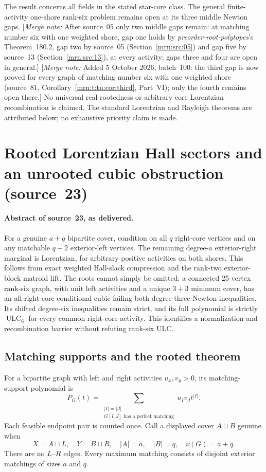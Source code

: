 \documentclass[11pt,a4paper]{article}
\theoremstyle{remark}\newtheorem{remark}[theorem]{Remark}
\newcommand{\ULC}{\operatorname{ULC}}      %
\newcommand{\mnote}[1]{[\textit{Merge note:} #1]}
\newcommand{\prp}{\emph{preorder-root-polytopes}}
\begin{document}
The result concerns all fields in the stated star-core class. The general
finite-activity one-shore rank-six problem remains open at its three middle
Newton gaps. \mnote{After source~05 only two middle gaps remain: at matching number six with one weighted shore, gap one holds by \prp's Theorem~180.2, gap two by source~05 (Section~\ref{mrn:src:05}) and gap five by source~13 (Section~\ref{mrn:src:13}), at every activity; gaps three and four are open in general.} \mnote{Added 5 October 2026, batch~100: the third gap is now proved for every graph of matching number six with one weighted shore (source~81, Corollary~\ref{mrn:t:tn:cor:third}, Part~VI); only the fourth remains open there.} No universal real-rootedness or arbitrary-core Lorentzian
recombination is claimed. The standard Lorentzian and Rayleigh theorems are
attributed below; no exhaustive priority claim is made.

\section{Rooted Lorentzian Hall sectors and an unrooted cubic obstruction (source~23)}\label{mrn:src:23}
\paragraph{Abstract of source~23, as delivered.} For a genuine $a+q$ bipartite cover, condition on all $q$ right-core vertices and on any matchable $q-2$ exterior-left vertices. The remaining degree-$a$ exterior-right marginal is Lorentzian, for arbitrary positive activities on both shores. This follows from exact weighted Hall-slack compression and the rank-two exterior-block matroid lift. The roots cannot simply be omitted: a connected 25-vertex rank-six graph, with unit left activities and a unique $3+3$ minimum cover, has an all-right-core conditional cubic failing both degree-three Newton inequalities. Its shifted degree-six inequalities remain strict, and its full polynomial is strictly $\ULC_6$ for every common right-core activity. This identifies a normalization and recombination barrier without refuting rank-six ULC.

\subsection{Matching supports and the rooted theorem}
For a bipartite graph with left and right activities $u_x,v_y>0$, its matching-support polynomial is
\[
 P_G(t)=\sum_{\substack{|I|=|J|\\G[I,J]\text{ has a perfect matching}}}
                 u_Iv_Jt^{|I|}.
\]
Each feasible endpoint pair is counted once. Call a displayed cover $A\sqcup B$ genuine when
\[
 X=A\sqcup L,\quad Y=B\sqcup R,\quad
 |A|=a,\quad |B|=q,\quad \nu(G)=a+q.
\]
There are no $L$--$R$ edges. Every maximum matching consists of disjoint exterior matchings of sizes $a$ and $q$.
\end{document}
